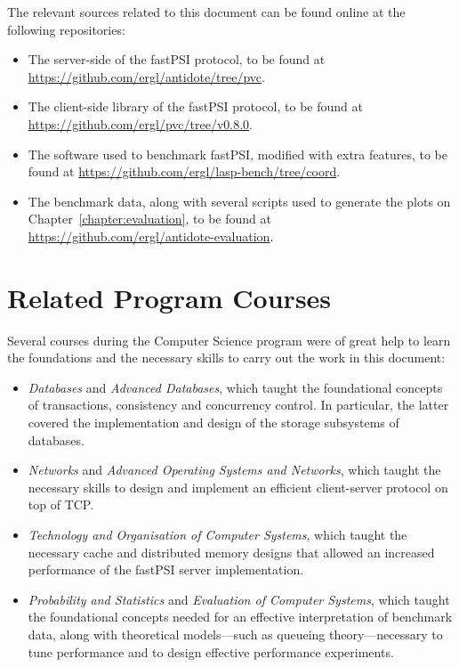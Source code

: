 The relevant sources related to this document can be found online at the following repositories:

\begin{itemize}
    \item The server-side of the fastPSI protocol, to be found at \url{https://github.com/ergl/antidote/tree/pvc}.

    \item The client-side library of the fastPSI protocol, to be found at \url{https://github.com/ergl/pvc/tree/v0.8.0}.

    \item The software used to benchmark fastPSI, modified with extra features, to be found at \url{https://github.com/ergl/lasp-bench/tree/coord}.

    \item The benchmark data, along with several scripts used to generate the plots on Chapter~\ref{chapter:evaluation}, to be found at \url{https://github.com/ergl/antidote-evaluation}.
\end{itemize}

\section{Related Program Courses}

Several courses during the Computer Science program were of great help to learn the foundations and the necessary skills to carry out the work in this document:

\begin{itemize}
    \item \emph{Databases} and \emph{Advanced Databases}, which taught the foundational concepts of transactions, consistency and concurrency control. In particular, the latter covered the implementation and design of the storage subsystems of databases.

    \item \emph{Networks} and \emph{Advanced Operating Systems and Networks}, which taught the necessary skills to design and implement an efficient client-server protocol on top of TCP.

    \item \emph{Technology and Organisation of Computer Systems}, which taught the necessary cache and distributed memory designs that allowed an increased performance of the fastPSI server implementation.

    \item \emph{Probability and Statistics} and \emph{Evaluation of Computer Systems}, which taught the foundational concepts needed for an effective interpretation of benchmark data, along with theoretical models---such as queueing theory---necessary to tune performance and to design effective performance experiments.
\end{itemize}
